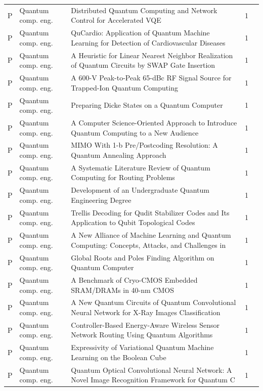 \documentclass[10pt]{article}
\begin{document}
\begin{longtable}{@{}llL{8.6cm}lL{4.2cm}@{}}
P & Quantum comp. eng. & Distributed Quantum Computing and Network Control for Accelerated VQE & 1 &  \\
P & Quantum comp. eng. & QuCardio: Application of Quantum Machine Learning for Detection of Cardiovascular Diseases & 1 &  \\
P & Quantum comp. eng. & A Heuristic for Linear Nearest Neighbor Realization of Quantum Circuits by SWAP Gate Insertion  & 1 &  \\
P & Quantum comp. eng. & A 600-V Peak-to-Peak 65-dBc RF Signal Source for Trapped-Ion Quantum Computing & 1 &  \\
P & Quantum comp. eng. & Preparing Dicke States on a Quantum Computer & 1 &  \\
P & Quantum comp. eng. & A Computer Science-Oriented Approach to Introduce Quantum Computing to a New Audience & 1 &  \\
P & Quantum comp. eng. & MIMO With 1-b Pre/Postcoding Resolution: A Quantum Annealing Approach & 1 &  \\
P & Quantum comp. eng. & A Systematic Literature Review of Quantum Computing for Routing Problems & 1 &  \\
P & Quantum comp. eng. & Development of an Undergraduate Quantum Engineering Degree & 1 &  \\
P & Quantum comp. eng. & Trellis Decoding for Qudit Stabilizer Codes and Its Application to Qubit Topological Codes & 1 &  \\
P & Quantum comp. eng. & A New Alliance of Machine Learning and Quantum Computing: Concepts, Attacks, and Challenges in  & 1 &  \\
P & Quantum comp. eng. & Global Roots and Poles Finding Algorithm on Quantum Computer & 1 &  \\
P & Quantum comp. eng. & A Benchmark of Cryo-CMOS Embedded SRAM/DRAMs in 40-nm CMOS & 1 &  \\
P & Quantum comp. eng. & A New Quantum Circuits of Quantum Convolutional Neural Network for X-Ray Images Classification & 1 &  \\
P & Quantum comp. eng. & Controller-Based Energy-Aware Wireless Sensor Network Routing Using Quantum Algorithms & 1 &  \\
P & Quantum comp. eng. & Expressivity of Variational Quantum Machine Learning on the Boolean Cube & 1 &  \\
P & Quantum comp. eng. & Quantum Optical Convolutional Neural Network: A Novel Image Recognition Framework for Quantum C & 1 &  \\

\end{longtable}
\end{document}
